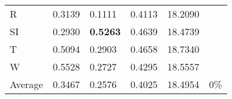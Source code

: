 \documentclass[11pt, a4paper]{article}
\begin{document}
\begin{table}[H]
\begin{tabular}{llllll}
R                                & 0.3139                            & 0.1111                            & 0.4113                               & 18.2090                                     &                                   \\
SI                        & 0.2930                            & \textbf{0.5263}                   & 0.4639                               & 18.4739                                     &                                   \\
T                              & 0.5094                            & 0.2903                            & 0.4658                               & 18.7340                                     &                                   \\
W                             & 0.5528                            & 0.2727                            & 0.4295                               & 18.5557                                     &                                   \\ \hline
Average                               & 0.3467                            & 0.2576                            & 0.4025                               & 18.4954                                     & 0\%
\end{tabular}
\end{table}
\end{document}
